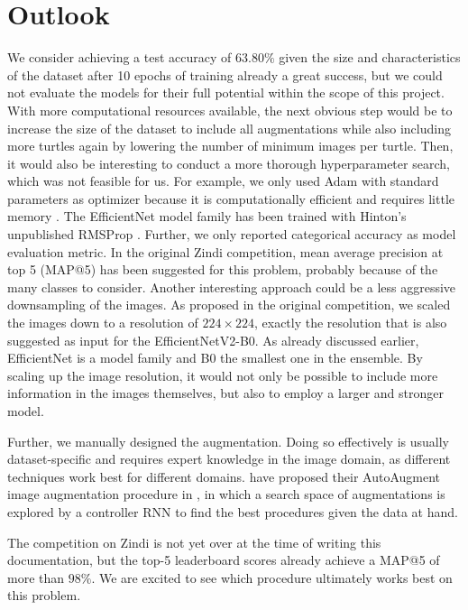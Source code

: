 \section{Outlook}

We consider achieving a test accuracy of $63.80\%$ given the size and characteristics of the dataset after 10 epochs of training already a great success, but we could not evaluate the models for their full potential within the scope of this project. With more computational resources available, the next obvious step would be to increase the size of the dataset to include all augmentations while also including more turtles again by lowering the number of minimum images per turtle. Then, it would also be interesting to conduct a more thorough hyperparameter search, which was not feasible for us. For example, we only used Adam with standard parameters as optimizer because it is computationally efficient and requires little memory \citep{Kingma2014}. The EfficientNet model family has been trained with Hinton's unpublished RMSProp \citep{Tan2019}. Further, we only reported categorical accuracy as model evaluation metric. In the original Zindi competition, mean average precision at top 5 (MAP@5) has been suggested for this problem, probably because of the many classes to consider. Another interesting approach could be a less aggressive downsampling of the images. As proposed in the original competition, we scaled the images down to a resolution of $224\times224$, exactly the resolution that is also suggested as input for the EfficientNetV2-B0. As already discussed earlier, EfficientNet is a model family and B0 the smallest one in the ensemble. By scaling up the image resolution, it would not only be possible to include more information in the images themselves, but also to employ a larger and stronger model.

Further, we manually designed the augmentation. Doing so effectively is usually dataset-specific and requires expert knowledge in the image domain, as different techniques work best for different domains. \citeauthor{Cubuk2018} have proposed their AutoAugment image augmentation procedure in \citeyear{Cubuk2018}, in which a search space of augmentations is explored by a controller RNN to find the best procedures given the data at hand.

The competition on Zindi is not yet over at the time of writing this documentation, but the top-5 leaderboard scores already achieve a MAP@5 of more than $98\%$. We are excited to see which procedure ultimately works best on this problem.